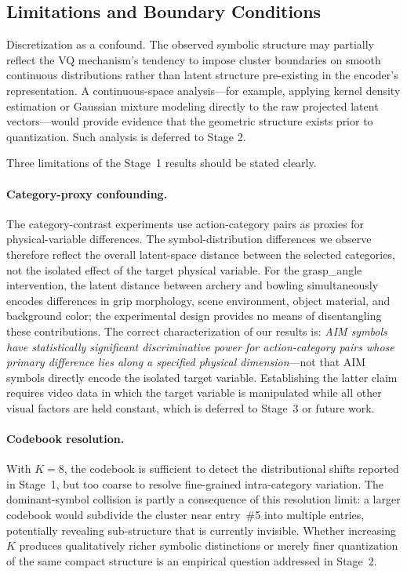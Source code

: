 \documentclass{article}
\begin{document}
\subsection{Limitations and Boundary Conditions}

Discretization as a confound. The observed symbolic structure may partially reflect the VQ mechanism's tendency to impose cluster boundaries on smooth continuous distributions rather than latent structure pre-existing in the encoder's representation. A continuous-space analysis—for example, applying kernel density estimation or Gaussian mixture modeling directly to the raw projected latent vectors—would provide evidence that the geometric structure exists prior to quantization. Such analysis is deferred to Stage 2.

Three limitations of the Stage~1 results should be stated clearly.

\paragraph{Category-proxy confounding.}
The category-contrast experiments use action-category pairs as proxies for
physical-variable differences.
The symbol-distribution differences we observe therefore reflect the
overall latent-space distance between the selected categories, not the
isolated effect of the target physical variable.
For the grasp\_angle intervention, the latent distance between archery
and bowling simultaneously encodes differences in grip morphology,
scene environment, object material, and background color; the
experimental design provides no means of disentangling these
contributions.
The correct characterization of our results is: \emph{AIM symbols
have statistically significant discriminative power for action-category
pairs whose primary difference lies along a specified physical
dimension}---not that AIM symbols directly encode the isolated target
variable.
Establishing the latter claim requires video data in which the target
variable is manipulated while all other visual factors are held
constant, which is deferred to Stage~3 or future work.

\paragraph{Codebook resolution.}
With $K = 8$, the codebook is sufficient to detect the distributional
shifts reported in Stage~1, but too coarse to resolve fine-grained
intra-category variation.
The dominant-symbol collision is partly a consequence of this
resolution limit: a larger codebook would subdivide the cluster near
entry~\#5 into multiple entries, potentially revealing sub-structure
that is currently invisible.
Whether increasing $K$ produces qualitatively richer symbolic
distinctions or merely finer quantization of the same compact
structure is an empirical question addressed in Stage~2.
\end{document}
